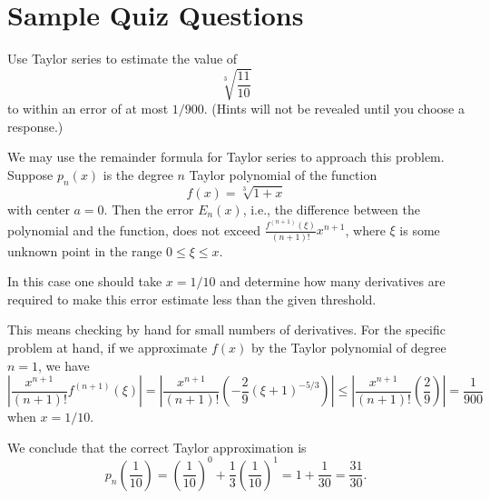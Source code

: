 \documentclass{ximera}
\begin{document}
\section*{Sample Quiz Questions}



\begin{question}%

Use Taylor series to estimate the value of
\[\sqrt[3]{\frac{11}{10}}\] to within an error of at most \(1/900\).
(Hints will not be revealed until you choose a response.)
\begin{multiplechoice}
\end{multiplechoice}
\begin{feedback}
We may use the remainder formula for Taylor series to approach this problem.
Suppose \(p_n(x)\) is the degree \(n\) Taylor polynomial of the function
\[ f(x) = \sqrt[3]{1+x}\]
with center \(a=0\). Then the error \(E_n(x)\), i.e., the difference between the polynomial and the function, does not exceed \(\frac{f^{(n+1)}(\xi)}{(n+1)!}x^{n+1}\), where \(\xi\) is some unknown point  in the range \(0 \leq \xi \leq x\). \begin{hint} In this case one should take \(x = 1/10\) and determine how many derivatives are required to make this error estimate less than the given threshold. \begin{hint} This means checking by hand for small numbers of derivatives. For the specific problem at hand, if we approximate \(f(x)\) by the Taylor polynomial of degree \( n = 1\), we have 
\[ \left| \frac{x^{n+1} }{(n+1)!} f^{(n+1)}(\xi) \right| = \left| \frac{x^{n+1}}{(n+1)!} \left( -\frac{2}{9} (\xi+1)^{-5/3} \right) \right| \leq \left| \frac{x^{n+1}}{(n+1)!} \left( \frac{2}{9} \right) \right| = \frac{1}{900} \] when \(x = 1/10\). \begin{hint}
We conclude that the correct Taylor approximation is
\[ p_n \left( \frac{1}{10}\right) =  \left(\frac{1}{10}\right)^{0} + \frac{1}{3}\left(\frac{1}{10}\right)^{1} =  1 + \frac{1}{30} = \frac{31}{30}.\]
\end{hint} \end{hint} \end{hint}
\end{feedback}

\end{question}
\end{document}
